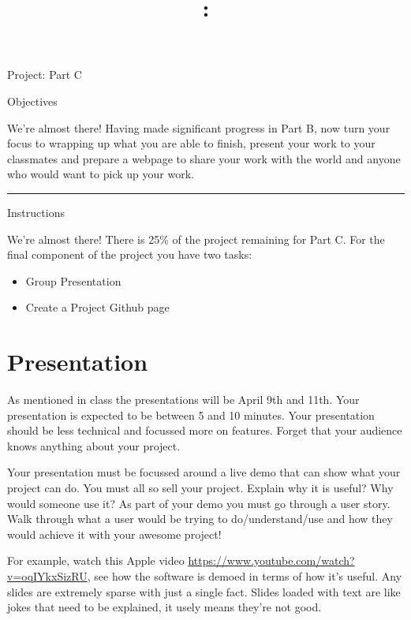 \documentclass[letterpaper]{article}
\title{\course{}: \activity{}}
\date{}
\newcommand{\activity}{Project: Part C}
\newcommand{\horizrule}{\noindent\rule{\linewidth}{0.15mm}}
\begin{document}
\reversemarginpar

\begin{center}
  \Large{\activity{}}
\end{center}

\begin{center}
  \large{Objectives}
\end{center}

\begin{center}
We're almost there!  Having made significant progress in Part B, now turn your focus to wrapping up what you are able to finish, present your work to your classmates and prepare a webpage to share your work with the world and anyone who would want to pick up your work.
\end{center}

\horizrule

\begin{center}
  \large{Instructions}
\end{center}

We're almost there!  There is 25\% of the project remaining for Part C.  For the final component of the project you have two tasks:

\begin{itemize}
\item Group Presentation
\item Create a Project Github page
\end{itemize}

\section{Presentation}

As mentioned in class the presentations will be April 9th and 11th.  Your presentation is expected to be between 5 and 10 minutes. Your presentation should be less technical and focussed more on features.  Forget that your audience knows anything about your project.

Your presentation must be focussed around a live demo that can show what your project can do.  You must all so sell your project. Explain why it is useful? Why would someone use it?  As part of your demo you must go through a user story.  Walk through what a user would be trying to do/understand/use and how they would achieve it with your awesome project!

For example, watch this Apple video \url{https://www.youtube.com/watch?v=oqIYkxSizRU}, see how the software is demoed in terms of how it's useful.  Any slides are extremely sparse with just a single fact.  Slides loaded with text are like jokes that need to be explained, it usely means they're not good.
\end{document}
